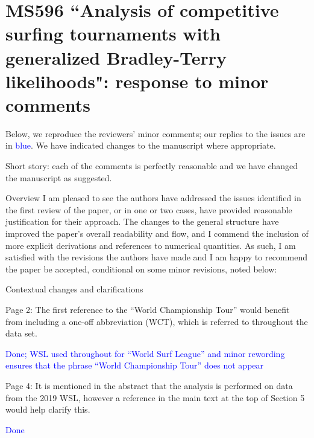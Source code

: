 \documentclass[12pt]{article}
\begin{document}
\section*{MS596 ``Analysis of competitive surfing tournaments with generalized Bradley-Terry likelihoods": response to minor comments}

Below, we reproduce the reviewers' minor comments; our replies to
the issues are in \textcolor{blue}{blue}.  We have indicated changes
to the manuscript where appropriate.

Short story: each of the  comments is perfectly reasonable and we have 
changed the manuscript as suggested.




Overview I am pleased to see the authors have addressed the issues
identified in the first review of the paper, or in one or two cases,
have provided reasonable justification for their approach. The changes
to the general structure have improved the paper’s overall readability
and flow, and I commend the inclusion of more explicit derivations and
references to numerical quantities. As such, I am satisfied with the
revisions the authors have made and I am happy to recommend the paper
be accepted, conditional on some minor revisions, noted below:



Contextual changes and clarifications

Page 2: The first reference to the ``World Championship Tour'' would
benefit from including a one-off abbreviation (WCT), which is referred
to throughout the data set.

\textcolor{blue}{Done; WSL used throughout for ``World Surf League''
  and minor rewording ensures that the phrase ``World Championship
  Tour'' does not appear}

Page 4: It is mentioned in the abstract that the analysis is performed
on data from the 2019 WSL, however a reference in the main text at the
top of Section 5 would help clarify this.

\textcolor{blue}{Done}
\end{document}
